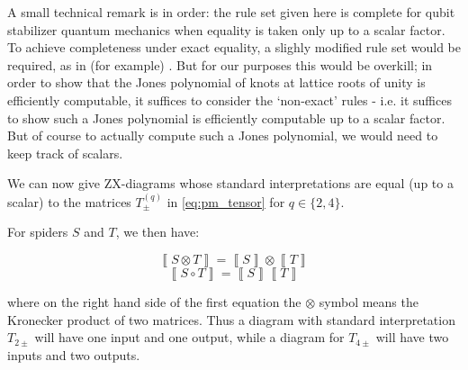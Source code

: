 \begin{remark}\label{rem:qubit_scalar_exactness} 
	A small technical remark is in order: the rule set given here is complete for qubit stabilizer quantum mechanics when equality is taken only up to a scalar factor. To achieve completeness under exact equality, a slighly modified rule set would be required, as in (for example) \cite{backens_scalar_exact}. But for our purposes this would be overkill; in order to show that the Jones polynomial of knots at lattice roots of unity is efficiently computable, it suffices to consider the `non-exact' rules - i.e. it suffices to show such a Jones polynomial is efficiently computable up to a scalar factor. But of course to actually compute such a Jones polynomial, we would need to keep track of scalars.
\end{remark}

We can now give ZX-diagrams whose standard interpretations are equal (up to a scalar) to the matrices $T_{\pm}^{(q)}$ in \eqref{eq:pm_tensor} for $q \in \{2, 4\}$.



For spiders $S$ and $T$, we then have:

\begin{equation}
	\left\llbracket S \otimes T \right\rrbracket = \left\llbracket S \right\rrbracket \otimes \left\llbracket T \right\rrbracket 
\end{equation} 
\begin{equation}	
	\left\llbracket S \circ T \right\rrbracket = \left\llbracket S \right\rrbracket \left\llbracket T \right\rrbracket 
\end{equation} 

where on the right hand side of the first equation the $\otimes$ symbol means the Kronecker product of two matrices. Thus a diagram with standard interpretation $T_{2\pm}$ will have one input and one output, while a diagram for $T_{4\pm}$ will have two inputs and two outputs.

